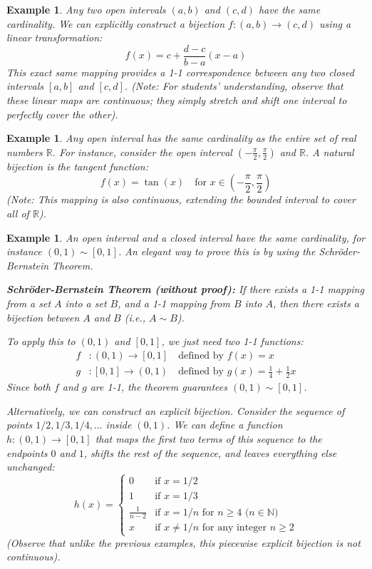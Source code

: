 \documentclass{article}
\theoremstyle{mythm}
\newtheorem{example}[theorem]{Example}
\begin{document}
\begin{example}
Any two open intervals $(a, b)$ and $(c, d)$ have the same cardinality. We can explicitly construct a bijection $f: (a, b) \to (c, d)$ using a linear transformation:
\[
f(x) = c + \frac{d-c}{b-a}(x-a)
\]
This exact same mapping provides a 1-1 correspondence between any two closed intervals $[a, b]$ and $[c, d]$. 
(Note: For students' understanding, observe that these linear maps are continuous; they simply stretch and shift one interval to perfectly cover the other).
\end{example}

\begin{example}
Any open interval has the same cardinality as the entire set of real numbers $\mathbb{R}$. For instance, consider the open interval $(-\frac{\pi}{2}, \frac{\pi}{2})$ and $\mathbb{R}$. A natural bijection is the tangent function:
\[
f(x) = \tan(x) \quad \text{for } x \in \left(-\frac{\pi}{2}, \frac{\pi}{2}\right)
\]
(Note: This mapping is also continuous, extending the bounded interval to cover all of $\mathbb{R}$).
\end{example}

\begin{example}
An open interval and a closed interval have the same cardinality, for instance $(0, 1) \sim [0, 1]$. An elegant way to prove this is by using the Schröder-Bernstein Theorem.

\textbf{Schröder-Bernstein Theorem (without proof):} If there exists a 1-1 mapping from a set $A$ into a set $B$, and a 1-1 mapping from $B$ into $A$, then there exists a bijection between $A$ and $B$ (i.e., $A \sim B$).

To apply this to $(0, 1)$ and $[0, 1]$, we just need two 1-1 functions:
\begin{align*}
    f &: (0, 1) \to [0, 1] \quad \text{defined by } f(x) = x \\
    g &: [0, 1] \to (0, 1) \quad \text{defined by } g(x) = \frac{1}{4} + \frac{1}{2}x
\end{align*}
Since both $f$ and $g$ are 1-1, the theorem guarantees $(0,1) \sim [0,1]$.

Alternatively, we can construct an explicit bijection. Consider the sequence of points $1/2, 1/3, 1/4, \dots$ inside $(0,1)$. We can define a function $h: (0, 1) \to [0, 1]$ that maps the first two terms of this sequence to the endpoints $0$ and $1$, shifts the rest of the sequence, and leaves everything else unchanged:
\[
h(x) = \begin{cases} 
      0 & \text{if } x = 1/2 \\
      1 & \text{if } x = 1/3 \\
      \frac{1}{n-2} & \text{if } x = 1/n \text{ for } n \geq 4 \text{ ($n \in \mathbb{N}$)} \\
      x & \text{if } x \neq 1/n \text{ for any integer } n \geq 2
   \end{cases}
\]
(Observe that unlike the previous examples, this piecewise explicit bijection is not continuous).
\end{example}
\end{document}
